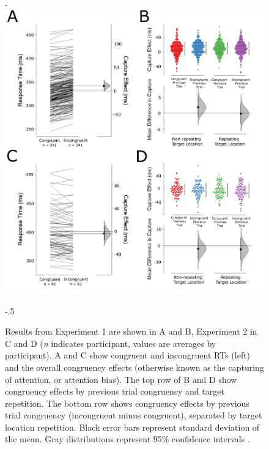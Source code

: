 \documentclass[issue,twocolumn,empirical, authordate,10pt]{jote-new-article}
\begin{document}
\begin{figure}[b!]

\begin{adjustwidth}{-\fullwidthlen}{}
  \includegraphics[width=\linewidth]{Figure2.png}
\label{fig:fig2}
\end{adjustwidth}
  \captionsetup{width=\dimexpr \linewidth + \fullwidthlen}
 \begin{adjustwidth}{-.5\fullwidthlen}{}
 \caption{
Results from Experiment 1 are shown in A and B, Experiment 2 in C and D (\emph{n} indicates participant, values are averages by participant). A and C show congruent and incongruent RTs (left) and the overall congruency effects (otherwise known as the capturing of attention, or attention bias). The top row of B and D show congruency effects by previous trial congruency and target repetition. The bottom row shows congruency effects by previous trial congruency (incongruent minus congruent), separated by target location repetition. Black error bars represent standard deviation of the mean. Gray distributions represent 95\% confidence intervals \parencite{Ho2019}.  }
\end{adjustwidth}


\end{figure}
\end{document}
